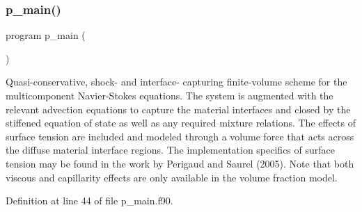\subsubsection{\texorpdfstring{p\+\_\+main()}{p\_main()}}
{\footnotesize\ttfamily program p\+\_\+main (\begin{DoxyParamCaption}{ }\end{DoxyParamCaption})}



Quasi-\/conservative, shock-\/ and interface-\/ capturing finite-\/volume scheme for the multicomponent Navier-\/\+Stokes equations. The system is augmented with the relevant advection equations to capture the material interfaces and closed by the stiffened equation of state as well as any required mixture relations. The effects of surface tension are included and modeled through a volume force that acts across the diffuse material interface regions. The implementation specifics of surface tension may be found in the work by Perigaud and Saurel (2005). Note that both viscous and capillarity effects are only available in the volume fraction model. 



Definition at line 44 of file p\+\_\+main.\+f90.

